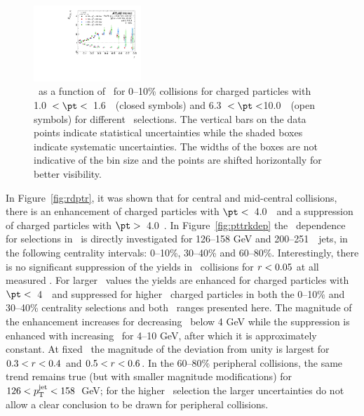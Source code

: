 \begin{figure}[ht]
\centerline{
\includegraphics[width=0.36\textwidth]{figures/results/RDpT_dR_trk3_trk6_cent0}}
\caption{\RDptr\ as a function of \rvar\ for 0--10\% collisions for charged particles with 1.0~$< \pt <$~1.6~\GeV\ (closed symbols) and 6.3~$< \pt <$10.0~\GeV\ (open symbols) for different \ptjet\ selections.
The vertical bars on the data points indicate statistical uncertainties while the shaded boxes indicate systematic uncertainties.
The widths of the boxes are not indicative of the bin size and the points are shifted horizontally for better visibility.}
\label{fig:ptjetdep}
\end{figure}


In Figure~\ref{fig:rdptr}, it was shown that for central and mid-central collisions, there is an enhancement of charged particles with $\pt <$~4.0~\GeV\ and a suppression of charged particles with $\pt >$~4.0~\GeV.
In Figure~\ref{fig:pttrkdep} the \pt\ dependence for selections in \rvar\ is directly investigated for 126--158 GeV and 200--251~\GeV\ jets, in the following centrality intervals: 0--10\%, 30--40\% and 60--80\%.
Interestingly, there is no significant suppression of the yields in \pbpb\ collisions for $\mbox{$r$} < 0.05$ at all measured \pt.
For larger \rvar\ values the yields are enhanced for charged particles with $\pt <$~4~\GeV\ and suppressed for higher \pt\ charged particles in both the 0--10\% and 30--40\% centrality selections and both \ptjet\  ranges presented here.
The magnitude of the enhancement increases for decreasing \pt\ below 4 GeV while the suppression is enhanced with increasing \pt\ for 4--10 GeV, after which it is approximately constant.
At fixed \pt\ the magnitude of the deviation from unity is largest for $0.3< \mbox{$r$} < 0.4$ and $0.5< \mbox{$r$} < 0.6$.
In the 60--80\% peripheral collisions, the same trend remains true (but with smaller magnitude modifications) for \mbox{$126 < \mbox{$p_{\mathrm{T}}^{\mathrm{jet}}$} < 158$ GeV}; for the higher \ptjet\ selection the larger uncertainties do not allow a clear conclusion to be drawn for peripheral collisions.

